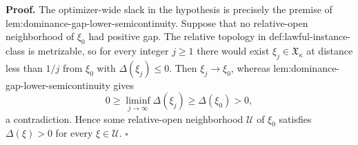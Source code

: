 \textbf{Proof.}
The optimizer-wide slack in the hypothesis is precisely the premise of lem:dominance-gap-lower-semicontinuity.  Suppose that no relative-open neighborhood of \(\xi_0\) had positive gap.  The relative topology in def:lawful-instance-class is metrizable, so for every integer \(j\ge1\) there would exist \(\xi_j\in\mathfrak X_\kappa\) at distance less than \(1/j\) from \(\xi_0\) with \(\Delta(\xi_j)\le0\).  Then \(\xi_j\to\xi_0\), whereas lem:dominance-gap-lower-semicontinuity gives
\[
0\ge\liminf_{j\to\infty}\Delta(\xi_j)
\ge\Delta(\xi_0)>0,
\]
a contradiction.  Hence some relative-open neighborhood \(\mathcal U\) of \(\xi_0\) satisfies \(\Delta(\xi)>0\) for every \(\xi\in\mathcal U\).  \(\square\)